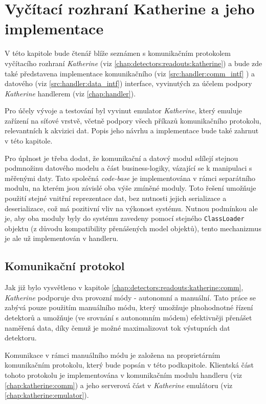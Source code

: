 

\chapter{Vyčítací rozhraní Katherine a jeho implementace}\label{chap:katherine}
V této kapitole bude čtenář blíže seznámen s komunikačním protokolem vyčítacího rozhraní \textit{Katherine} (viz \ref{chap:detectors:readouts:katherine}) a bude zde také představena implementace komunikačního (viz \ref{src:handler:comm_intf} ) a datového (viz \ref{src:handler:data_intf}) interface, vyvinutých za účelem podpory \textit{Katherine} handlerem (viz \ref{chap:handler}). 

Pro účely vývoje a testování byl vyvinut emulator \textit{Katherine}, který emuluje zařízení na síťové vrstvě, včetně podpory všech příkazů komunikačního protokolu, relevantních k akvizici dat. Popis jeho návrhu a implementace bude také zahrnut v této kapitole.

Pro úplnost je třeba dodat, že komunikační a datový modul sdílejí stejnou podmnožinu datového modelu a část business-logiky, vázající se k manipulaci s měřenými daty. Tato společná \textit{code-base} je implementována v rámci separátního modulu, na kterém jsou závislé oba výše zmíněné moduly. Toto řešení umožňuje použití stejné vnitřní reprezentace dat, bez nutnosti jejich serializace a deserializace, což má pozitivní vliv na výkonost systému. Nutnou podmínkou ale je, aby oba moduly byly do systému zavedeny pomocí stejného \texttt{ClassLoader} objektu (z důvodu kompatibility přenášených model objektů), tento mechanizmus je ale už implementován v handleru.

\section{Komunikační protokol}\label{chap:katherine:protocol}
Jak již bylo vysvětleno v kapitole \ref{chap:detectors:readouts:katherine:comm}, \textit{Katherine} podporuje dva provozní módy - autonomní a manuální. Tato práce se zabývá pouze použitím manuálního módu, který umožňuje plnohodnotné řízení detektorů a umožňuje (ve srovnání s autonomním módem) efektivněji přenášet naměřená data, díky čemuž je možné maximalizovat tok výstupních dat detektoru.

Komunikace v rámci manuálního módu je založena na proprietárním komunikačním protokolu, který bude popsán v této podkapitole. Klientská část tohoto protokolu je implementována v komunikačním modulu handleru (viz \ref{chap:katherine:comm}) a jeho serverová část v \textit{Katherine} emulátoru (viz \ref{chap:katherine:emulator}).

